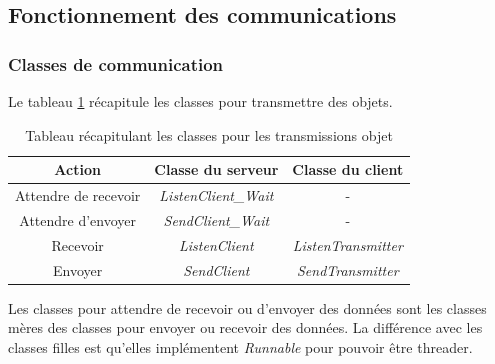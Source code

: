 \documentclass[a4paper,11pt]{report}
\begin{document}
\subsection{Fonctionnement des communications}

\subsubsection{Classes de communication}
Le tableau \ref{tab1comClasses} récapitule les classes pour transmettre des objets.

  \begin{table}
    \begin{center}
      \begin{tabular}{|c|c|c|}
         \hline \textbf{Action}&\textbf{Classe du serveur}&\textbf{Classe du client} \\
         \hline Attendre de recevoir&\textit{ListenClient\_Wait}&- \\
         \hline Attendre d’envoyer&\textit{SendClient\_Wait}&- \\
         \hline Recevoir&\textit{ListenClient}&\textit{ListenTransmitter} \\
         \hline Envoyer&\textit{SendClient}&\textit{SendTransmitter}\\
         \hline
      \end{tabular}
      \caption{Tableau récapitulant les classes pour les transmissions objet}  
      \label{tab1comClasses}
    \end{center}
  \end{table}
  
  Les classes pour attendre de recevoir ou d’envoyer des données sont les classes mères des classes pour envoyer ou recevoir des données. La différence avec les classes filles est qu’elles implémentent \textit{Runnable} pour pouvoir être threader.
\end{document}
